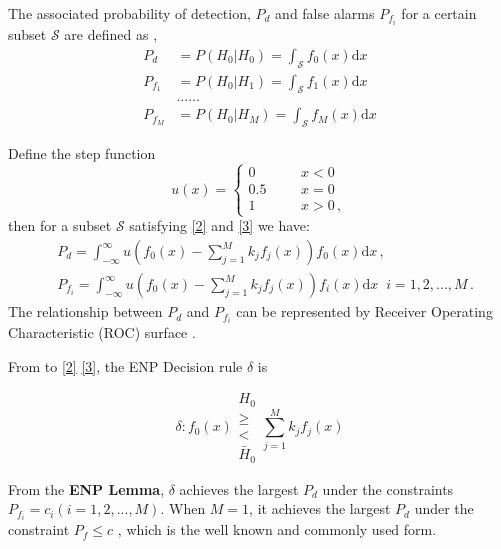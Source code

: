 The associated probability of detection, $P_d$ and false alarms $P_{f_i}$ for a certain subset $\mathcal{S}$ are defined as
\cite{neyman1933problem}, 
\begin{equation}
\begin{split}
P_d &= P(H_0 | H_0) = \int_{\mathcal{S}}f_0(x)\mathrm{d}x\\
P_{f_1} &= P(H_0 | H_1) = \int_{\mathcal{S}}f_1(x)\mathrm{d}x\\
&......\\
P_{f_M} &= P(H_0 | H_M) = \int_{\mathcal{S}}f_M(x)\mathrm{d}x
\end{split}
\end{equation}

 Define the step function
\begin{equation}
   \label{equ: step function}
   u(x) = \begin{cases}
     0\;\;\;\;\;\;&x < 0\\
     0.5\;\;\;\;\;\;&x=0\\
     1\;\;\;\;\;\;&x>0\,,
   \end{cases}
\end{equation}
then for a subset $\mathcal{S}$ satisfying \eqref{2} and \eqref{3} we have:
\begin{equation}
\label{equ: pf and pd}
\begin{split}
&P_d = \int_{-\infty}^{\infty} u(f_0(x) - \sum_{j=1}^{M}k_jf_j(x)) f_0(x)\mathrm{d}x	\,, \\
&P_{f_i} = \int_{-\infty}^{\infty} u(f_0(x) - \sum_{j=1}^{M}k_jf_j(x)) f_i(x) \mathrm{d}x\;\;	 i=1, 2, ..., M\,.
\end{split}
\end{equation}
The relationship between $P_d$ and $P_{f_i}$ can be represented by Receiver Operating Characteristic (ROC) surface \cite{LehmannTest}.

From to \eqref{2} \eqref{3}, the ENP Decision rule $\delta$ is

\begin{equation}
\label{equ: decision rule}
\delta: f_0(x) \substack{H_0 \\ \geq \\ < \\ \bar{H}_0}  \sum_{j=1}^{M} k_jf_j(x)
\end{equation}

From the  \textbf{ENP Lemma}, $\delta$  achieves the largest $P_d$ under the constraints $P_{f_i} = c_i (i = 1, 2, ..., M)$.
When $M=1$, it achieves the largest $P_d$ under the constraint $P_f \leq c$ \cite{LehmannTest}, which is the well known and commonly used form.

